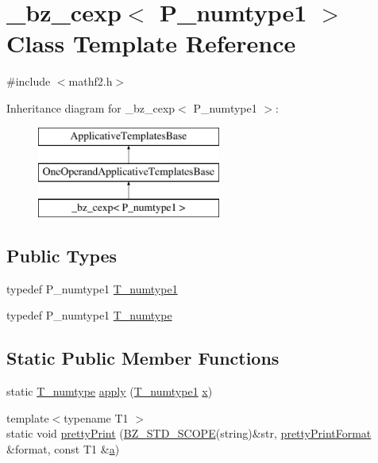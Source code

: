 \hypertarget{class__bz__cexp}{}\section{\+\_\+bz\+\_\+cexp$<$ P\+\_\+numtype1 $>$ Class Template Reference}
\label{class__bz__cexp}


{\ttfamily \#include $<$mathf2.\+h$>$}

Inheritance diagram for \+\_\+bz\+\_\+cexp$<$ P\+\_\+numtype1 $>$\+:\begin{figure}[H]
\begin{center}
\leavevmode
\includegraphics[height=3.000000cm]{class__bz__cexp}
\end{center}
\end{figure}
\subsection*{Public Types}
\begin{DoxyCompactItemize}
\item 
typedef P\+\_\+numtype1 \hyperlink{class__bz__cexp_a35d0954c5146133097fb3362834f60b0}{T\+\_\+numtype1}
\item 
typedef P\+\_\+numtype1 \hyperlink{class__bz__cexp_ad010f04a62a62aae44539befdfe5c2be}{T\+\_\+numtype}
\end{DoxyCompactItemize}
\subsection*{Static Public Member Functions}
\begin{DoxyCompactItemize}
\item 
static \hyperlink{class__bz__cexp_ad010f04a62a62aae44539befdfe5c2be}{T\+\_\+numtype} \hyperlink{class__bz__cexp_a76c769007b7e0ea3f1df2191827ee1f4}{apply} (\hyperlink{class__bz__cexp_a35d0954c5146133097fb3362834f60b0}{T\+\_\+numtype1} \hyperlink{vecnorm1_8cc_ac73eed9e41ec09d58f112f06c2d6cb63}{x})
\item 
{\footnotesize template$<$typename T1 $>$ }\\static void \hyperlink{class__bz__cexp_ab1e6d112ceb37e6c08e853834bce1931}{pretty\+Print} (\hyperlink{numinquire_8h_a2b24ffc3b4ef9803956bc7715c6c7b83}{B\+Z\+\_\+\+S\+T\+D\+\_\+\+S\+C\+O\+P\+E}(string)\&str, \hyperlink{classprettyPrintFormat}{pretty\+Print\+Format} \&format, const T1 \&\hyperlink{gen__mat5files_8m_aae328bf20413f220e38aec4d95bfd6da}{a})
\end{DoxyCompactItemize}


